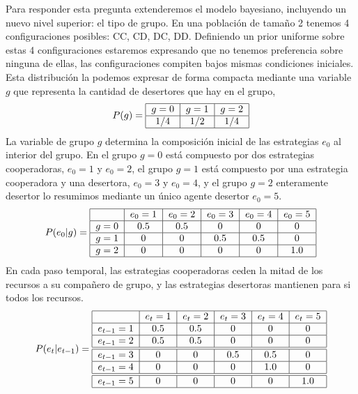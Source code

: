 \documentclass[a4paper,10pt]{article}
\begin{document}
Para responder esta pregunta extenderemos el modelo bayesiano, incluyendo un nuevo nivel superior: el tipo de grupo.
En una población de tamaño 2 tenemos 4 configuraciones posibles: CC, CD, DC, DD.
Definiendo un prior uniforme sobre estas 4 configuraciones estaremos expresando que no tenemos preferencia sobre ninguna de ellas, las configuraciones compiten bajos mismas condiciones iniciales.
Esta distribución la podemos expresar de forma compacta mediante una variable $g$ que representa la cantidad de desertores que hay en el grupo,
%
\begin{align}
\centering
P(g) = \begin{tabular}{|c|c|c|c|}
        \hline
        $g=0$ & $g=1$ & $g=2$ \\ \hline
        $1/4$ & $1/2$ & $1/4$ \\ \hline
\end{tabular}
\end{align}
%
La variable de grupo $g$ determina la composición inicial de las estrategias $e_0$ al interior del grupo.
En el grupo $g=0$ está compuesto por dos estrategias cooperadoras, $e_0=1$ y $e_0=2$, el grupo $g=1$ está compuesto por una estrategia cooperadora y una desertora, $e_0=3$ y $e_0=4$, y el grupo $g=2$ enteramente desertor lo resumimos mediante un único agente desertor $e_0=5$.
%
\begin{align}
\centering
P(e_0|g) = \begin{tabular}{|c|c|c|c|c|c|}
        \hline
        & $e_0=1$ & $e_0=2$ & $e_0=3$ &  $e_0=4$ & $e_0=5$ \\ \hline
       $g=0$ & $0.5$ & $0.5$ & $0$ &  $0$ & $0$  \\ \hline
       $g=1$ & $0$ & $0$ & $0.5$ & $0.5$ & $0$ \\ \hline
       $g=2$ & $0$ & $0$ & $0$ & $0$ & $1.0$ \\ \hline
\end{tabular}
\end{align}
%
En cada paso temporal, las estrategias cooperadoras ceden la mitad de los recursos a su compañero de grupo, y las estrategias desertoras mantienen para si todos los recursos.
%
\begin{align}
\centering
P(e_{t}|e_{t-1}) = \begin{tabular}{|c|c|c|c|c|c|}
        \hline
        & $e_t=1$ & $e_t=2$ & $e_t=3$ &  $e_t=4$ & $e_t=5$ \\ \hline
       $e_{t-1}=1$ & $0.5$ & $0.5$ & $0$ &  $0$ & $0$  \\ \hline
       $e_{t-1}=2$ & $0.5$ & $0.5$ & $0$ & $0$ & $0$  \\ \hline \hline
       $e_{t-1}=3$ & $0$ & $0$ & $0.5$ & $0.5$ & $0$  \\ \hline
       $e_{t-1}=4$ & $0$ & $0$ & $0$ & $1.0$ & $0$  \\ \hline \hline
       $e_{t-1}=5$ & $0$ & $0$ & $0$ & $0$ & $1.0$  \\ \hline
\end{tabular}
\end{align}
\end{document}
